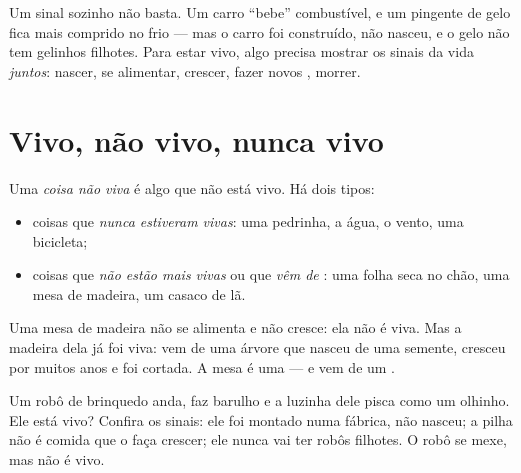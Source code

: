 \begin{remark}\label{rem:g1:living-or-not:allsigns}
Um sinal sozinho não basta. Um carro ``bebe'' combustível, e um
pingente de gelo fica mais comprido no frio --- mas o carro foi
construído, não nasceu, e o gelo não tem gelinhos filhotes. Para
estar vivo, algo precisa mostrar os sinais da vida \emph{juntos}:
nascer, se alimentar, crescer, fazer novos , morrer.
\end{remark}

\section{Vivo, não vivo, nunca vivo}

\begin{definition}\label{def:g1:living-or-not:nonliving}
Uma \emph{coisa não viva} é algo que não está
vivo. Há dois tipos:
\begin{itemize}
  \item coisas que \emph{nunca estiveram vivas}: uma pedrinha, a água, o vento, uma bicicleta;
  \item coisas que \emph{não estão mais vivas}
ou que \emph{vêm de} : uma folha seca no
        chão, uma mesa de madeira, um casaco de lã.
\end{itemize}
\end{definition}

\begin{example}\label{ex:g1:living-or-not:table}
Uma mesa de madeira não se alimenta e não cresce: ela não é viva.
Mas a madeira dela já foi viva: vem de uma árvore que nasceu de uma
semente, cresceu por muitos anos e foi cortada. A mesa é uma  --- e vem de um .
\end{example}

\begin{example}[E um robô?]\label{ex:g1:living-or-not:robot}
Um robô de brinquedo anda, faz barulho e a luzinha dele pisca como
um olhinho. Ele está vivo? Confira os sinais: ele foi montado numa
fábrica, não nasceu; a pilha não é comida que o faça crescer; ele
nunca vai ter robôs filhotes. O robô se mexe, mas não é vivo.
\end{example}

